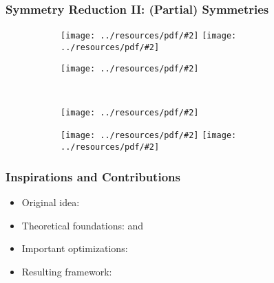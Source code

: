 \documentclass{beamer}
\newcommand{\includeressource}[2][]{\texttt{[image: ../resources/pdf/\#2]}}
\begin{document}
\begin{frame}
  \frametitle{Symmetry Reduction II: (Partial) Symmetries}

  \begin{figure}
    \centering
    \begin{subfigure}{.3\textwidth}
      \begin{overprint}
        \includeressource[width=\textwidth]{%
          regular_mesh_4_4_mapping1_noarrow.pdf}
        \includeressource[width=\textwidth]{%
          regular_mesh_4_4_mapping1.pdf}
      \end{overprint}
    \end{subfigure}
    \hspace*{.5cm}
    \begin{subfigure}{.3\textwidth}
      \includeressource[width=\textwidth]{regular_mesh_4_4_mapping2.pdf}
    \end{subfigure} \\
    \vspace*{.5cm}
    \begin{subfigure}{.3\textwidth}
      \includeressource[width=\textwidth]{regular_mesh_4_4_mapping4.pdf}
    \end{subfigure}
    \hspace*{.5cm}
    \begin{subfigure}{.3\textwidth}
      \begin{overprint}
        \includeressource[width=\textwidth]{%
          regular_mesh_4_4_mapping5_noarrow.pdf}
        \includeressource[width=\textwidth]{%
          regular_mesh_4_4_mapping5.pdf}
      \end{overprint}
    \end{subfigure}
  \end{figure}
\end{frame}

\begin{frame}
  \frametitle{Inspirations and Contributions}

  \begin{itemize}
    \setlength\itemsep{.25cm}

    \item<1-> Original idea: \cite{Goens}
    \item<2-> Theoretical foundations: \cite{Holt} and \cite{Mitchell}
    \item<3-> Important optimizations: \cite{Donaldson}
    \item<4-> Resulting framework: \cite{mpsym}
  \end{itemize}
\end{frame}
\end{document}
